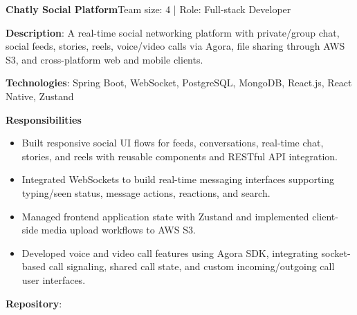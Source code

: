   \resumeProjectHeading
    {\textbf{Chatly Social Platform}}{Team size: 4 | Role: Full-stack Developer}
    \resumeItemListStart
      \item \textbf{Description}: A real-time social networking platform with private/group chat, social feeds, stories, reels,
        voice/video calls via Agora, file sharing through AWS S3, and cross-platform web and mobile clients.
      \item \textbf{Technologies}: Spring Boot, WebSocket, PostgreSQL, MongoDB, React.js, React Native, Zustand
      \item \textbf{Responsibilities}
        \begin{itemize}
          \item Built responsive social UI flows for feeds, conversations, real-time chat, stories, and reels with reusable components and RESTful API integration.
          \item Integrated WebSockets to build real-time messaging interfaces supporting typing/seen status, message actions, reactions, and search.
          \item Managed frontend application state with Zustand and implemented client-side media upload workflows to AWS S3.
          \item Developed voice and video call features using Agora SDK, integrating socket-based call signaling, shared call state, and custom incoming/outgoing call user interfaces.
        \end{itemize}
      \item \textbf{Repository}: \href{https://github.com/nvminh162/chatly-social-platform}{}
    \resumeItemListEnd

\resumeSubHeadingListEnd
